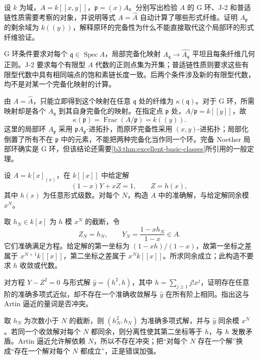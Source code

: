 \begin{exercise}\label{b3:ex:D-excellence-conditions}
	设 \(k\) 为域，\(A=k[\![x,y]\!]\)，\(\mathfrak p=(x)A\)。分别写出检验 \(A\) 的 G 环、J-2 和普适链性质需要考察的对象，并说明等式 \(A=\widehat A\) 自动计算了哪些形式纤维。证明 \(A_{\mathfrak p}\) 的剩余域为 \(k(\!(y)\!)\)，解释原环的完备性为什么不能直接取代这个局部环的形式纤维验证。
\end{exercise}
\begin{solution}
	G 环条件要求对每个 \(\mathfrak q\in\operatorname{Spec}A\)，局部完备化映射 \(A_{\mathfrak q}\to\widehat{A_{\mathfrak q}}\) 平坦且每条纤维几何正则。J-2 要求每个有限型 \(A\) 代数的正则点集为开集；普适链性质则要求这些有限型代数中具有相同端点的饱和素链长度一致。后两个条件涉及新的有限型代数，均不是对某一个完备化映射的计算。

	由 \(A=\widehat A\)，只能立即得到这个映射在任意 \(\mathfrak q\) 处的纤维为 \(\kappa(\mathfrak q)\)。对于 G 环，所需映射却是各个 \(A_{\mathfrak q}\) 到其自身完备化的映射。在指定点 \(\mathfrak p\) 处，\(A/\mathfrak p=k[\![y]\!]\)，故
	\[
		\kappa(\mathfrak p)=\operatorname{Frac}(A/\mathfrak p)=k(\!(y)\!).
	\]
	这里的局部环 \(A_{\mathfrak p}\) 采用 \(\mathfrak pA_{\mathfrak p}\)-进拓扑，而原环完备性采用 \((x,y)\)-进拓扑；局部化倒置了所有不在 \(\mathfrak p\) 中的元素，不能把两种完备化当作同一个环。完备 Noether 局部环确实是 G 环，但该结论还需要\cref{b3:thm:excellent-basic-classes}所引用的一般定理。
\end{solution}

\begin{exercise}\label{b3:ex:D-linear-approximation}
	设 \(A=k[x]_{(x)}\)，在 \(k[\![x]\!]\) 中给定解
	\[
		(1-x)Y+xZ=1,\qquad Z=h(x),
	\]
	其中 \(h(x)\) 为任意形式级数。对每个 \(N\)，构造 \(A\) 中的准确解，与给定解同余模 \(x^N\)。
\end{exercise}
\begin{solution}
	取 \(h_N\in k[x]\) 为 \(h\) 模 \(x^N\) 的截断，令
	\[
		Z_N=h_N,\qquad Y_N=\frac{1-xh_N}{1-x}\in A.
	\]
	它们准确满足方程。给定解的第一坐标为 \((1-xh)/(1-x)\)，故第一坐标之差属于 \(x^{N+1}k[\![x]\!]\)，第二坐标之差属于 \(x^Nk[\![x]\!]\)。所求同余成立；此构造不要求 \(h\) 收敛或代数。
\end{solution}

\begin{exercise}\label{b3:ex:D-artin-quantifiers}
	对方程 \(Y-Z^2=0\) 与形式解 \(\widehat y=(h^2,h)\)，其中 \(h=\sum_{j\ge1}j!x^j\)，证明存在任意阶的准确多项式近似，却不存在一个准确收敛解与 \(\widehat y\) 在所有阶上相同。指出这与 Artin 逼近的量词是否冲突。
\end{exercise}
\begin{solution}
	取 \(h_N\) 为次数小于 \(N\) 的截断，则 \((h_N^2,h_N)\) 为准确多项式解，并与 \(\widehat y\) 同余模 \(x^N\)。若同一个收敛解对每个 \(N\) 都同余，则分离性使其第二坐标等于 \(h\)，与 \(h\) 发散矛盾。Artin 逼近允许解依赖 \(N\)，所以不存在冲突；把“对每个 \(N\) 存在一个解”换成“存在一个解对每个 \(N\) 都成立”，正是错误加强。
\end{solution}

